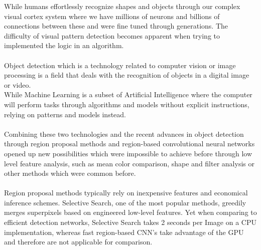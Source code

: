 
While humans effortlessly recognize shapes and objects through our complex visual cortex system where we have millions of neurons and
billions of connections between these and were fine tuned through generations. The difficulty of visual pattern detection becomes
apparent when trying to implemented the logic in an algorithm.\cite{neuralnetworksanddeeplearning} \\ \\
Object detection which is a technology related to computer vision or image processing is a field that deals with the recognition of objects
in a digital image or video.\\
While Machine Learning is a subset of Artificial Intelligence where the computer will perform tasks through algorithms and models without
explicit instructions, relying on patterns  and models instead.\\ \\
Combining these two technologies and the recent advances in object detection through region proposal methods and region-based convolutional
neural networks opened up new possibilities which were impossible to achieve before through low level feature analysis, such as mean
color comparison, shape and filter analysis or other methods which were common before. \\ \\
Region proposal methods typically rely on inexpensive features and economical inference schemes. Selective Search, one of the most popular
methods, greedily merges superpixels based on engineered low-level features. Yet when comparing to efficient detection networks, Selective
Search takes 2 seconds per Image on a CPU implementation, whereas fast region-based CNN's take advantage of the GPU and therefore are not
applicable for comparison.\cite{fasterrcnn}

